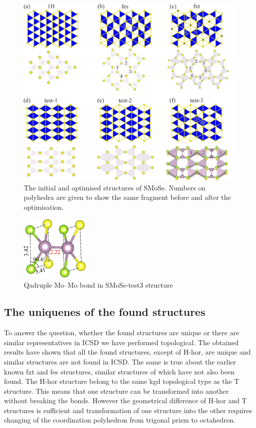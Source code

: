 \documentclass[a4paperm]{article}
\begin{document}
\begin{figure}[H] \centering
        \includegraphics[width=\textwidth]{H-based.png}
        \caption{The initial and optimised structures of SMoSe. Numbers on polyhedra are given to show the same fragment before and after the optimisation.}
\label{H-based}
\end{figure}

\begin{figure}[H]
	\includegraphics[width=0.3\textwidth]{test3_momo.png}
	\caption{Qadruple Mo--Mo bond in SMoSe-test3 structure}
\label{test3_momo}
\end{figure}








\subsection{The uniquenes of the found structures}

To answer the question, whether the found structures are unique or there are similar representatives in ICSD we have performed topological.
The obtained results have shown that all the found structures, except of H-hor, are unique and similar structures are not found in ICSD.
The same is true about the earlier known fxt and fes structures, similar structures of which have not also been found. 
The H-hor structure belong to the same kgd topological type as the T structure.
This means that one structure can be transformed into another without breaking the bonds.
However the geometrical difference of H-hor and T structures is sufficient and transformation of one structure into the other requires changing of the coordination polyhedron from trigonal prism to octahedron.
\end{document}

